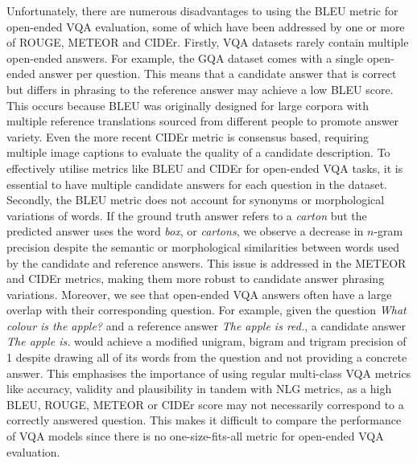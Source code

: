 Unfortunately, there are numerous disadvantages to using the BLEU metric for open-ended VQA evaluation, some of which have been addressed by one or more of ROUGE, METEOR and CIDEr.
Firstly, VQA datasets rarely contain multiple open-ended answers. For example, the GQA dataset \cite{hudson2019gqa} comes with a single open-ended answer per question. This means that a candidate answer that is correct but differs in phrasing to the reference answer may achieve a low BLEU score. This occurs because BLEU was originally designed for large corpora with multiple reference translations sourced from different people to promote answer variety. Even the more recent CIDEr metric is consensus based, requiring multiple image captions to evaluate the quality of a candidate description. To effectively utilise metrics like BLEU and CIDEr for open-ended VQA tasks, it is essential to have multiple candidate answers for each question in the dataset.
Secondly, the BLEU metric does not account for synonyms or morphological variations of words. If the ground truth answer refers to a \textit{carton} but the predicted answer uses the word \textit{box}, or \textit{cartons}, we observe a decrease in \(n\)-gram precision despite the semantic or morphological similarities between words used by the candidate and reference answers. This issue is addressed in the METEOR and CIDEr metrics, making them more robust to candidate answer phrasing variations.
Moreover, we see that open-ended VQA answers often have a large overlap with their corresponding question. For example, given the question \textit{What colour is the apple?} and a reference answer \textit{The apple is red.}, a candidate answer \textit{The apple is.} would achieve a modified unigram, bigram and trigram precision of 1 despite drawing all of its words from the question and not providing a concrete answer. This emphasises the importance of using regular multi-class VQA metrics like accuracy, validity and plausibility in tandem with NLG metrics, as a high BLEU, ROUGE, METEOR or CIDEr score may not necessarily correspond to a correctly answered question. This makes it difficult to compare the performance of VQA models since there is no one-size-fits-all metric for open-ended VQA evaluation.




